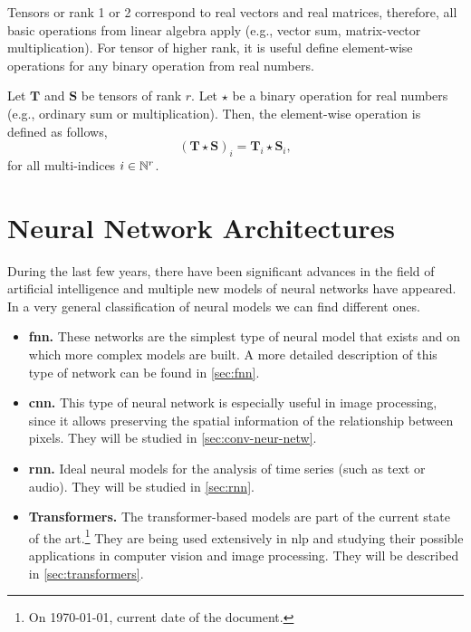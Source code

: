 Tensors or rank 1 or 2 correspond to real vectors and real matrices, therefore,
all basic operations from linear algebra apply (e.g., vector sum, matrix-vector
multiplication). For tensor of higher rank, it is useful define element-wise
operations for any binary operation from real numbers.

Let \(\mathbf{T}\) and \(\mathbf{S}\) be tensors of rank \(r\). Let \(\star\)
be a binary operation for real numbers (e.g., ordinary sum or
multiplication). Then, the element-wise operation is defined as follows,
\begin{equation}
  (\mathbf{T} \star \mathbf{S})_i = \mathbf{T}_i \star \mathbf{S}_i,
\end{equation}
for all multi-indices \(i \in \mathbb{N}^r\).



\section{Neural Network Architectures}

During the last few years, there have been significant advances in the field of
artificial intelligence and multiple new models of neural networks have
appeared. In a very general classification of neural models we can find
different ones.

\begin{itemize}
  \item \textbf{\acl*{fnn}.} These networks are the simplest type of neural
  model that exists and on which more complex models are built. A more detailed
  description of this type of network can be found in
  \vref{sec:fnn}.
  \item \textbf{\acl*{cnn}.} This type of neural network is especially useful
  in image processing, since it allows preserving the spatial information of
  the relationship between pixels. They will be studied in
  \vref{sec:conv-neur-netw}.
  \item \textbf{\acl*{rnn}.} Ideal neural models for the analysis of time
  series (such as text or audio). They will be studied in
  \vref{sec:rnn}.
  \item \textbf{Transformers.} The transformer-based models are part of the
  current state of the art.\footnote{On \today, current date of the document.}
  They are being used extensively in \gls{nlp} and studying their possible
  applications in computer vision and image processing. They will be described
  in \vref{sec:transformers}.
\end{itemize}


